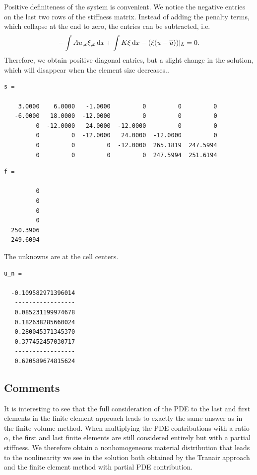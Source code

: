 \documentclass[a4paper,12pt]{article}
\newcommand{\intd}{\,{\rm d}}
\begin{document}
Positive definiteness of the system is convenient. We notice the negative entries on the last two rows of the stiffness matrix. Instead of adding the penalty terms, which collapse at the end to zero, the entries can be subtracted, i.e.
\begin{equation*}
- \int Au_{,x}\xi_{,x}\intd x + \int K \xi \intd x -  (\xi(u-\overline{u}))\vert_{L}= 0.
\end{equation*}
Therefore, we obtain positive diagonal entries, but a slight change in the solution, which will disappear when the element size decreases..\\
\begin{verbatim}
s =

    3.0000    6.0000   -1.0000         0         0         0
   -6.0000   18.0000  -12.0000         0         0         0
         0  -12.0000   24.0000  -12.0000         0         0
         0         0  -12.0000   24.0000  -12.0000         0
         0         0         0  -12.0000  265.1819  247.5994
         0         0         0         0  247.5994  251.6194
\end{verbatim}
\begin{verbatim}
f =

         0
         0
         0
         0
  250.3906
  249.6094
\end{verbatim}
The unknowns are at the cell centers.
\begin{verbatim}
u_n =

  -0.109582971396014
   -----------------
   0.085231199974678
   0.182638285660024
   0.280045371345370
   0.377452457030717
   -----------------
   0.620589674815624
\end{verbatim}
\subsection{Comments}
It is interesting to see that the full consideration of the PDE to the last and first elements in the finite element approach leads to exactly the same answer as in the finite volume method. When multiplying the PDE contributions with a ratio $\alpha$, the first and last finite elements are still considered entirely but with a partial stiffness. We therefore obtain a nonhomogeneous material distribution that leads to the nonlinearity we see in the solution both obtained by the Tranair approach and the finite element method with partial PDE contribution. 
\end{document}
